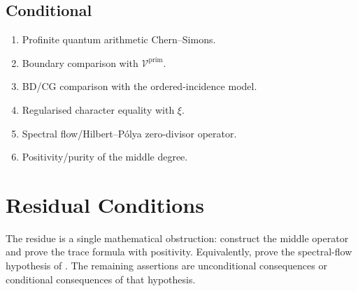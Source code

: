 \subsection*{Conditional}
\label{v4-arith:w8-a:what-closes:cond}

\begin{enumerate}
\item Profinite quantum arithmetic Chern--Simons.
\item Boundary comparison with \(\mathcal V^{\mathrm{prim}}\).
\item BD/CG comparison with the ordered-incidence model.
\item Regularised character equality with \(\xi\).
\item Spectral flow/Hilbert--P\'olya zero-divisor operator.
\item Positivity/purity of the middle degree.
\end{enumerate}

\section{Residual Conditions}
\label{v4-arith:w8-a:residual}

The residue is a single mathematical obstruction: construct the middle
operator and prove the trace formula with positivity. Equivalently,
prove the spectral-flow hypothesis of
. The remaining assertions are
unconditional consequences or conditional consequences of that
hypothesis.
